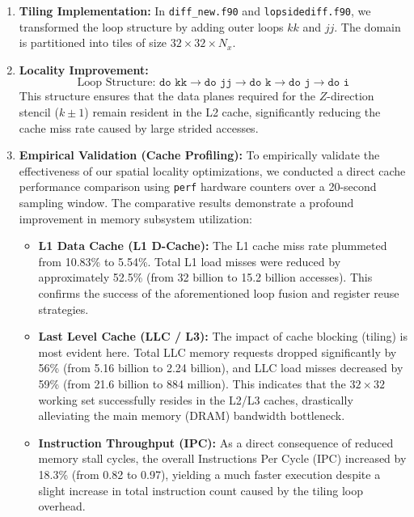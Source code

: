 \begin{enumerate}
    \item \textbf{Tiling Implementation:} In \texttt{diff\_new.f90} and \texttt{lopsidediff.f90}, we transformed the loop structure by adding outer loops $kk$ and $jj$. 
    The domain is partitioned into tiles of size $32 \times 32 \times N_x$.
    
    \item \textbf{Locality Improvement:} 
    \begin{equation}
        \text{Loop Structure: } \texttt{do kk} \to \texttt{do jj} \to \texttt{do k} \to \texttt{do j} \to \texttt{do i}
    \end{equation}
    This structure ensures that the data planes required for the $Z$-direction stencil ($k \pm 1$) remain resident in the L2 cache, significantly reducing the cache miss rate caused by large strided accesses.
    
    \item \textbf{Empirical Validation (Cache Profiling):} To empirically validate the effectiveness of our spatial locality optimizations, we conducted a direct cache performance comparison using \texttt{perf} hardware counters over a 20-second sampling window. The comparative results demonstrate a profound improvement in memory subsystem utilization:
    \begin{itemize}
        \item \textbf{L1 Data Cache (L1 D-Cache):} The L1 cache miss rate plummeted from 10.83\% to 5.54\%. Total L1 load misses were reduced by approximately 52.5\% (from 32 billion to 15.2 billion accesses). This confirms the success of the aforementioned loop fusion and register reuse strategies.
        \item \textbf{Last Level Cache (LLC / L3):} The impact of cache blocking (tiling) is most evident here. Total LLC memory requests dropped significantly by 56\% (from 5.16 billion to 2.24 billion), and LLC load misses decreased by 59\% (from 21.6 billion to 884 million). This indicates that the $32 \times 32$ working set successfully resides in the L2/L3 caches, drastically alleviating the main memory (DRAM) bandwidth bottleneck.
        \item \textbf{Instruction Throughput (IPC):} As a direct consequence of reduced memory stall cycles, the overall Instructions Per Cycle (IPC) increased by 18.3\% (from 0.82 to 0.97), yielding a much faster execution despite a slight increase in total instruction count caused by the tiling loop overhead.
    \end{itemize}
\end{enumerate}
